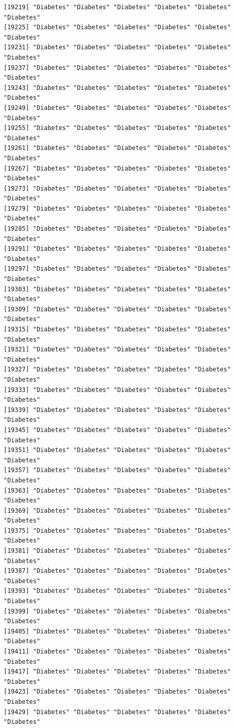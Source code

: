 \documentclass[
  letterpaper,
  DIV=11,
  numbers=noendperiod]{scrartcl}
\begin{document}
\begin{verbatim}
[19219] "Diabetes" "Diabetes" "Diabetes" "Diabetes" "Diabetes" "Diabetes"
[19225] "Diabetes" "Diabetes" "Diabetes" "Diabetes" "Diabetes" "Diabetes"
[19231] "Diabetes" "Diabetes" "Diabetes" "Diabetes" "Diabetes" "Diabetes"
[19237] "Diabetes" "Diabetes" "Diabetes" "Diabetes" "Diabetes" "Diabetes"
[19243] "Diabetes" "Diabetes" "Diabetes" "Diabetes" "Diabetes" "Diabetes"
[19249] "Diabetes" "Diabetes" "Diabetes" "Diabetes" "Diabetes" "Diabetes"
[19255] "Diabetes" "Diabetes" "Diabetes" "Diabetes" "Diabetes" "Diabetes"
[19261] "Diabetes" "Diabetes" "Diabetes" "Diabetes" "Diabetes" "Diabetes"
[19267] "Diabetes" "Diabetes" "Diabetes" "Diabetes" "Diabetes" "Diabetes"
[19273] "Diabetes" "Diabetes" "Diabetes" "Diabetes" "Diabetes" "Diabetes"
[19279] "Diabetes" "Diabetes" "Diabetes" "Diabetes" "Diabetes" "Diabetes"
[19285] "Diabetes" "Diabetes" "Diabetes" "Diabetes" "Diabetes" "Diabetes"
[19291] "Diabetes" "Diabetes" "Diabetes" "Diabetes" "Diabetes" "Diabetes"
[19297] "Diabetes" "Diabetes" "Diabetes" "Diabetes" "Diabetes" "Diabetes"
[19303] "Diabetes" "Diabetes" "Diabetes" "Diabetes" "Diabetes" "Diabetes"
[19309] "Diabetes" "Diabetes" "Diabetes" "Diabetes" "Diabetes" "Diabetes"
[19315] "Diabetes" "Diabetes" "Diabetes" "Diabetes" "Diabetes" "Diabetes"
[19321] "Diabetes" "Diabetes" "Diabetes" "Diabetes" "Diabetes" "Diabetes"
[19327] "Diabetes" "Diabetes" "Diabetes" "Diabetes" "Diabetes" "Diabetes"
[19333] "Diabetes" "Diabetes" "Diabetes" "Diabetes" "Diabetes" "Diabetes"
[19339] "Diabetes" "Diabetes" "Diabetes" "Diabetes" "Diabetes" "Diabetes"
[19345] "Diabetes" "Diabetes" "Diabetes" "Diabetes" "Diabetes" "Diabetes"
[19351] "Diabetes" "Diabetes" "Diabetes" "Diabetes" "Diabetes" "Diabetes"
[19357] "Diabetes" "Diabetes" "Diabetes" "Diabetes" "Diabetes" "Diabetes"
[19363] "Diabetes" "Diabetes" "Diabetes" "Diabetes" "Diabetes" "Diabetes"
[19369] "Diabetes" "Diabetes" "Diabetes" "Diabetes" "Diabetes" "Diabetes"
[19375] "Diabetes" "Diabetes" "Diabetes" "Diabetes" "Diabetes" "Diabetes"
[19381] "Diabetes" "Diabetes" "Diabetes" "Diabetes" "Diabetes" "Diabetes"
[19387] "Diabetes" "Diabetes" "Diabetes" "Diabetes" "Diabetes" "Diabetes"
[19393] "Diabetes" "Diabetes" "Diabetes" "Diabetes" "Diabetes" "Diabetes"
[19399] "Diabetes" "Diabetes" "Diabetes" "Diabetes" "Diabetes" "Diabetes"
[19405] "Diabetes" "Diabetes" "Diabetes" "Diabetes" "Diabetes" "Diabetes"
[19411] "Diabetes" "Diabetes" "Diabetes" "Diabetes" "Diabetes" "Diabetes"
[19417] "Diabetes" "Diabetes" "Diabetes" "Diabetes" "Diabetes" "Diabetes"
[19423] "Diabetes" "Diabetes" "Diabetes" "Diabetes" "Diabetes" "Diabetes"
[19429] "Diabetes" "Diabetes" "Diabetes" "Diabetes" "Diabetes" "Diabetes"

\end{verbatim}
\end{document}
